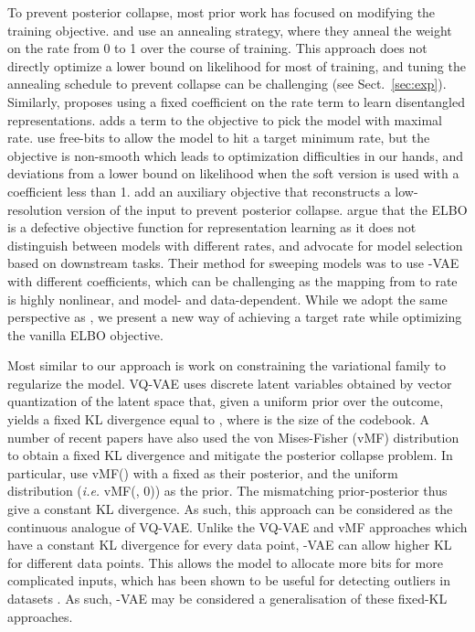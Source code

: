 \documentclass{article} \usepackage{iclr2019_conference,times}
\newcommand{\sref}[1]{Sect.~\ref{#1}}
\def\ie{\emph{i.e. }}
\begin{document}
To prevent posterior collapse, most prior work has focused on modifying the training objective. \citet{Bowman2015, Yang2017, SAVAE} and \citet{PixelVAE} use an annealing strategy, where they anneal the weight on the rate from 0 to 1 over the course of training. This approach does not directly optimize a lower bound on likelihood for most of training, and tuning the annealing schedule to prevent collapse can be challenging (see \sref{sec:exp}). Similarly, \citet{betavae} proposes using a fixed coefficient  on the rate term to learn disentangled representations. \citet{InfoVAE} adds a term to the objective to pick the model with maximal rate. \citet{VLAE, IAF} use free-bits to allow the model to hit a target minimum rate, but the objective is non-smooth which leads to optimization difficulties in our hands, and deviations from a lower bound on likelihood when the soft version is used with a coefficient less than 1. \citet{agave} add an auxiliary objective that reconstructs a low-resolution version of the input to prevent posterior collapse. \citet{Alemi2017} argue that the ELBO is a defective objective function for representation learning as it does not distinguish between models with different rates, and advocate for model selection based on downstream tasks. Their method for sweeping models was to use -VAE with different coefficients, which can be challenging as the mapping from  to rate is highly nonlinear, and model- and data-dependent. While we adopt the same perspective as \citet{Alemi2017}, we present a new way of achieving a target rate while optimizing the vanilla ELBO objective.


Most similar to our approach is work on constraining the variational family to regularize the model. 
VQ-VAE \citep{VQVAE} uses discrete latent variables obtained by vector quantization of the latent space that, given a uniform prior over the outcome, yields a fixed KL divergence equal to , where  is the size of the codebook. A number of recent papers have also used the von Mises-Fisher (vMF) distribution to obtain a fixed KL divergence and mitigate the posterior collapse problem. In particular, \citet{Guu2017, xu2018spherical, davidson2018hyperspherical} use vMF() with a fixed  as their posterior, and the uniform distribution (\ie vMF(, 0)) as the prior. The mismatching prior-posterior thus give a constant KL divergence. As such, this approach can be considered as the continuous analogue of VQ-VAE. Unlike the VQ-VAE and vMF approaches which have a constant KL divergence for every data point, -VAE can allow higher KL for different data points. This allows the model to allocate more bits for more complicated inputs, which has been shown to be useful for detecting outliers in datasets \citep{alemi2018uncertainty}. As such, -VAE may be considered a generalisation of these fixed-KL approaches.
\end{document}
